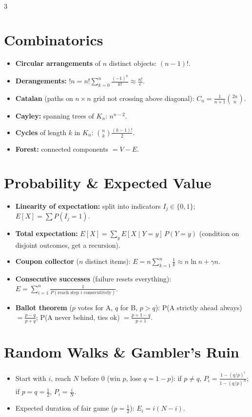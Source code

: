 \documentclass[10pt]{article}
\newenvironment{notes}{\footnotesize\begin{itemize}}{\end{itemize}}
\begin{document}
\begin{multicols*}{3}
\section{Combinatorics}
\begin{notes}
\item \textbf{Circular arrangements} of $n$ distinct objects: $(n-1)!$.
\item \textbf{Derangements:} $!n=n!\sum_{k=0}^{n}\frac{(-1)^k}{k!}\approx \frac{n!}{e}$.
\item \textbf{Catalan} (paths on $n\times n$ grid not crossing above diagonal): $C_n=\frac{1}{n+1}\binom{2n}{n}$.
\item \textbf{Cayley:} spanning trees of $K_n$: $n^{n-2}$.
\item \textbf{Cycles} of length $k$ in $K_n$: $\binom{n}{k}\frac{(k-1)!}{2}$.
\item \textbf{Forest:} connected components $=V-E$.
\end{notes}

\section{Probability \& Expected Value}
\begin{notes}
\item \textbf{Linearity of expectation:} split into indicators $I_j\in\{0,1\}$; $E[X]=\sum P(I_j=1)$.
\item \textbf{Total expectation:} $E[X]=\sum_y E[X\mid Y=y]\,P(Y=y)$ (condition on disjoint outcomes, get a recursion).
\item \textbf{Coupon collector} ($n$ distinct items): $E=n\sum_{k=1}^{n}\frac1k\approx n\ln n+\gamma n$.
\item \textbf{Consecutive successes} (failure resets everything): $E=\sum_{i=1}^{n}\frac{1}{P(\text{reach step } i \text{ consecutively})}$.
\item \textbf{Ballot theorem} ($p$ votes for A, $q$ for B, $p>q$): P(A strictly ahead always) $=\frac{p-q}{p+q}$; P(A never behind, ties ok) $=\frac{p+1-q}{p+1}$.
\end{notes}

\section{Random Walks \& Gambler's Ruin}
\begin{notes}
\item Start with $i$, reach $N$ before $0$ (win $p$, lose $q=1-p$): if $p\ne q$, $P_i=\frac{1-(q/p)^i}{1-(q/p)^N}$; if $p=q=\frac12$, $P_i=\frac iN$.
\item Expected duration of fair game ($p=\frac12$): $E_i=i(N-i)$.
\end{notes}


\end{multicols*}
\end{document}
